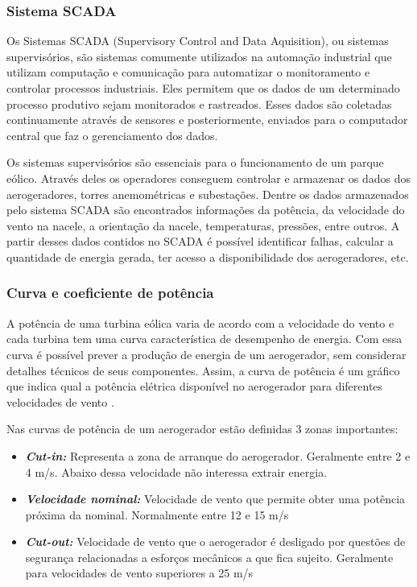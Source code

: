 \subsubsection{Sistema SCADA}
\label{Sec:scada}

Os Sistemas SCADA (Supervisory Control and Data Aquisition), ou sistemas supervisórios, são sistemas comumente utilizados na automação industrial que utilizam computação e comunicação para automatizar o monitoramento e controlar processos industriais. Eles permitem que os dados de um determinado processo produtivo sejam monitorados e rastreados. Esses dados são coletadas continuamente através de sensores e posteriormente, enviados para o computador central que faz o gerenciamento dos dados.

Os sistemas supervisórios são essenciais para o funcionamento de um parque eólico. Através deles os operadores conseguem controlar e armazenar os dados dos aerogeradores, torres anemométricas e subestações. Dentre os dados armazenados pelo sistema SCADA são encontrados informações da potência, da velocidade do vento na nacele, a orientação da nacele, temperaturas, pressões, entre outros. A partir desses dados contidos no SCADA é possível identificar falhas, calcular a quantidade de energia gerada, ter acesso a disponibilidade dos aerogeradores, etc.

\subsubsection{Curva e coeficiente de potência}
\label{Sec:curvaDePotencia}

A potência de uma turbina eólica varia de acordo com a velocidade do vento e cada turbina tem uma curva característica de desempenho de energia. Com essa curva é possível prever a produção de energia de um aerogerador, sem considerar detalhes técnicos de seus componentes. Assim, a curva de potência é um gráfico que indica qual a potência elétrica disponível no aerogerador para diferentes velocidades de vento \cite{iec-power-performance}.

Nas curvas de potência de um aerogerador estão definidas 3 zonas importantes:

\begin{itemize}
  \item \textbf{\textit{Cut-in:}} Representa a zona de arranque do aerogerador. Geralmente entre 2 e 4 m/s. Abaixo dessa velocidade não interessa extrair energia.
  \item \textbf{\textit{Velocidade nominal:}} Velocidade de vento que permite obter uma potência próxima da nominal. Normalmente entre 12 e 15 m/s
  \item \textbf{\textit{Cut-out:}} Velocidade de vento que o aerogerador é desligado por questões de segurança relacionadas a esforços mecânicos a que fica sujeito. Geralmente para velocidades de vento superiores a 25 m/s
\end{itemize}

